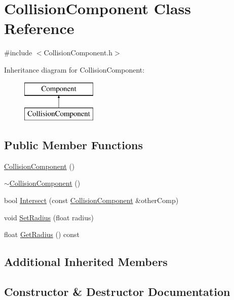 \hypertarget{class_collision_component}{}\section{Collision\+Component Class Reference}
\label{class_collision_component}


{\ttfamily \#include $<$Collision\+Component.\+h$>$}

Inheritance diagram for Collision\+Component\+:\begin{figure}[H]
\begin{center}
\leavevmode
\includegraphics[height=2.000000cm]{class_collision_component}
\end{center}
\end{figure}
\subsection*{Public Member Functions}
\begin{DoxyCompactItemize}
\item 
\mbox{\hyperlink{class_collision_component_a85c7ca3d9925b6c4bda8c8a2a6140aa9}{Collision\+Component}} ()
\item 
\mbox{\hyperlink{class_collision_component_a8927f6bcecb9862b870426af970ab3b7}{$\sim$\+Collision\+Component}} ()
\item 
bool \mbox{\hyperlink{class_collision_component_a612c1e5c553ef889ec5405bd236c4cef}{Intersect}} (const \mbox{\hyperlink{class_collision_component}{Collision\+Component}} \&other\+Comp)
\item 
void \mbox{\hyperlink{class_collision_component_a4bd86e9646160a141aed8a40704ad5fd}{Set\+Radius}} (float radius)
\item 
float \mbox{\hyperlink{class_collision_component_a3645d98e7ed2c6066d4779243b837e9a}{Get\+Radius}} () const
\end{DoxyCompactItemize}
\subsection*{Additional Inherited Members}


\subsection{Constructor \& Destructor Documentation}
\mbox{\label{class_collision_component_a85c7ca3d9925b6c4bda8c8a2a6140aa9}} 

